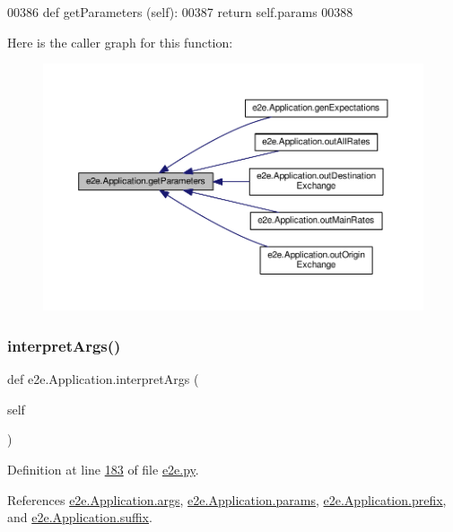 \begin{DoxyCode}
00386     \textcolor{keyword}{def }getParameters (self): 
00387         \textcolor{keywordflow}{return} self.params
00388             
\end{DoxyCode}
Here is the caller graph for this function\+:
\nopagebreak
\begin{figure}[H]
\begin{center}
\leavevmode
\includegraphics[width=350pt]{classe2e_1_1_application_ae7bc7b58f19d681635cfa8ae06d9769b_icgraph}
\end{center}
\end{figure}
\mbox{\label{classe2e_1_1_application_ae7b9559aa388f8178300fb4d7a9f9257}} 
\subsubsection{\texorpdfstring{interpret\+Args()}{interpretArgs()}}
{\footnotesize\ttfamily def e2e.\+Application.\+interpret\+Args (\begin{DoxyParamCaption}\item[{}]{self }\end{DoxyParamCaption})}



Definition at line \hyperlink{e2e_8py_source_l00183}{183} of file \hyperlink{e2e_8py_source}{e2e.\+py}.



References \hyperlink{e2e_8py_source_l00178}{e2e.\+Application.\+args}, \hyperlink{e2e_8py_source_l00138}{e2e.\+Application.\+params}, \hyperlink{e2e_8py_source_l00137}{e2e.\+Application.\+prefix}, and \hyperlink{e2e_8py_source_l00136}{e2e.\+Application.\+suffix}.



